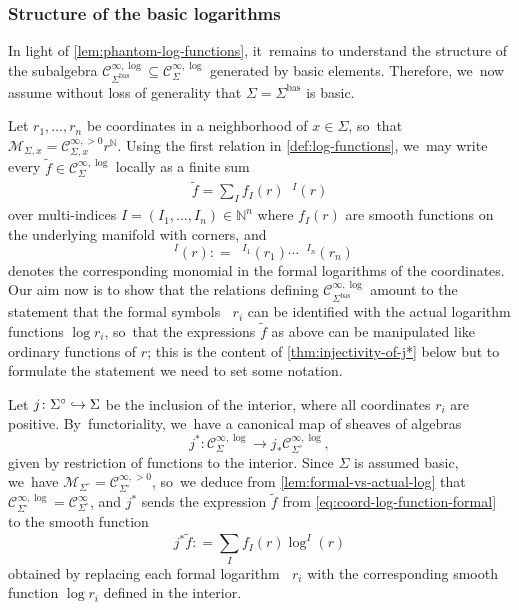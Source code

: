 \documentclass[JEP,XML,SOM,Unicode,NoFloatCountersInSection,published]{cedram}
\newcommand\hto{\mathrel{\lhook\joinrel\to}}
\theoremstyle{definition}
\theoremstyle{remark}
\newcommand{\NN}{\mathbb{N}}
\newcommand{\ulog}{\mathop{\widetilde{\log}}\nolimits}
\newcommand{\uf}{\widetilde{f}}
\newcommand{\defas}{\mathrel{\mathop:}=}
\newcommand{\cM}{\mathscr{M}}
\newcommand{\Cinf}[1]{\mathscr{C}^{\infty}_{#1}}
\newcommand{\Cinfpos}[1]{\mathscr{C}^{\infty, > 0}_{#1}}
\newcommand{\Cinflog}[1]{\mathscr{C}^{\infty,\log}_{#1}}
\newcommand{\Sig}{\Sigma}
\newcommand{\bas}[1]{{#1}^{\mathrm{bas}}}
\newcommand{\Sigbas}{\bas{\Sig}}
\newcommand{\intSig}{\Sigma^\circ}
\begin{document}
\subsubsection{Structure of the basic logarithms}
In light of \autoref{lem:phantom-log-functions}, it~remains to understand the structure of the subalgebra $\Cinflog{\Sigbas}\subseteq \Cinflog{\Sig}$ generated by basic elements. Therefore, we~now assume without loss of generality that $\Sig = \Sigbas$ is basic.

Let $r_1,\ldots,r_n$ be coordinates in a neighborhood of $x \in \Sig$, so~that $\cM_{\Sig,x}=\Cinfpos{\Sig,x}r^\NN$. Using the first relation in \autoref{def:log-functions}, we~may write every $\uf \in \Cinflog{\Sig}$ locally as a finite sum
\begin{align}
\uf = \sum_{I} f_I(r) \ulog{}\!^I(r)\label{eq:coord-log-function-formal}
\end{align}
over multi-indices $I=(I_1,\ldots,I_n) \in \NN^n$ where $f_I(r)$ are smooth functions on the underlying manifold with corners, and
\[
\ulog{}\!^I(r) \defas \ulog{}\!^{I_1}(r_1) \cdots \ulog{}\!^{I_n}(r_n)
\]
denotes the corresponding monomial in the formal logarithms of the coordinates. Our aim now is to show that the relations defining $\Cinflog{\Sigbas}$ amount to the statement that the formal symbols $\ulog r_i$ can be identified with the actual logarithm functions $\log r_i$, so~that the expressions $\uf$ as above can be manipulated like ordinary functions of $r$; this is the content of \autoref{thm:injectivity-of-j*} below but to formulate the statement we need to set some notation.

Let $j \colon \intSig \hto \Sig$ be the inclusion of the interior, where all coordinates $r_i$ are positive. By~functoriality, we~have a canonical map of sheaves of algebras
\begin{equation*}
j^*\colon \Cinflog{\Sig} \to j_*\Cinflog{\intSig},
\end{equation*}
given by restriction of functions to the interior. Since $\Sig$ is assumed basic, we~have $\cM_{\intSig} = \Cinfpos{\intSig}$, so~we deduce from \autoref{lem:formal-vs-actual-log} that $\Cinflog{\intSig} = \Cinf{\intSig}$, and $j^*$ sends the expression $\uf$ from \eqref{eq:coord-log-function-formal} to the smooth function
\begin{equation}\label{eq:coord-log-function-interior}
j^*\uf \defas \sum_{I} f_{I}(r) \log^I(r)
\end{equation}
obtained by replacing each formal logarithm $\ulog r_i$ with the corresponding smooth function $\log r_i$ defined in the interior.
\end{document}
